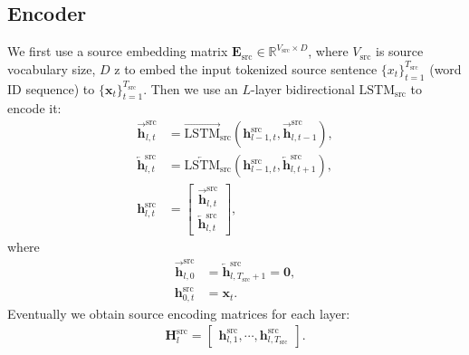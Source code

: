 \documentclass[11pt,a4paper]{article}
\begin{document}
\subsection{Encoder}
We first use a source embedding matrix $\mathbf{E}_\text{src}\in\mathbb{R}^{V_\text{src}\times D}$, where $V_\text{src}$ is source vocabulary size, $D$ z to embed the input tokenized source sentence $\{x_t\}_{t=1}^{T_\text{src}}$ (word ID sequence) to $\{\mathbf{x}_t\}_{t=1}^{T_\text{src}}$. Then we use an $L$-layer bidirectional $\mathrm{LSTM}_\text{src}$ to encode it:
\begin{align}
    \overrightarrow{\mathbf{h}}^\text{src}_{l,t} &= \overrightarrow{\mathrm{LSTM}}_\text{src}(\mathbf{h}^\text{src}_{l-1,t}, \overrightarrow{\mathbf{h}}^\text{src}_{l,t-1}),\\
    \overleftarrow{\mathbf{h}}^\text{src}_{l,t} &= \overleftarrow{\mathrm{LSTM}}_\text{src}(\mathbf{h}^\text{src}_{l-1,t}, \overleftarrow{\mathbf{h}}^\text{src}_{l,t+1}), \\
    \mathbf{h}^\text{src}_{l,t} &= \begin{bmatrix}
    \overrightarrow{\mathbf{h}}^\text{src}_{l,t} \\
    \overleftarrow{\mathbf{h}}^\text{src}_{l,t}
  \end{bmatrix},
\end{align}
where
\begin{align}
    \overrightarrow{\mathbf{h}}^\text{src}_{l,0} &= \overleftarrow{\mathbf{h}}^\text{src}_{l,T_\text{src}+1} = \mathbf{0}, \\
    \mathbf{h}^\text{src}_{0,t} &= \mathbf{x}_t.
\end{align}
Eventually we obtain source encoding matrices for each layer:
\begin{align}
    \mathbf{H}^\text{src}_l = \begin{bmatrix}
    \mathbf{h}^\text{src}_{l,1}, \cdots,
    \mathbf{h}^\text{src}_{l,T_\text{src}}
    \end{bmatrix}.
\end{align}
\end{document}
